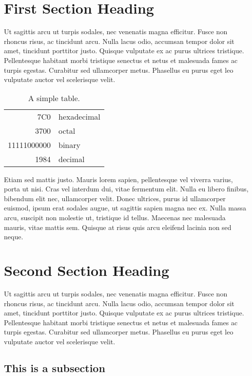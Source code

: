 \section{First Section Heading}

Ut sagittis arcu ut turpis sodales, nec venenatis magna efficitur. Fusce non rhoncus risus, ac tincidunt arcu. Nulla lacus odio, accumsan tempor dolor sit amet, tincidunt porttitor justo. Quisque vulputate ex ac purus ultrices tristique. Pellentesque habitant morbi tristique senectus et netus et malesuada fames ac turpis egestas. Curabitur sed ullamcorper metus. Phasellus eu purus eget leo vulputate auctor vel scelerisque velit.

\begin{table}[ht]
  \centering
  \caption{A simple table.}
  \begin{tabular}{|r|l|}
    \hline
    7C0 & hexadecimal \\
    3700 & octal \\ \cline{2-2}
    11111000000 & binary \\
    \hline \hline
    1984 & decimal \\
    \hline
  \end{tabular}
\end{table}
  
Etiam sed mattis justo. Mauris lorem sapien, pellentesque vel viverra varius, porta ut nisi. Cras vel interdum dui, vitae fermentum elit. Nulla eu libero finibus, bibendum elit nec, ullamcorper velit. Donec ultrices, purus id ullamcorper euismod, ipsum erat sodales augue, ut sagittis sapien magna nec ex. Nulla massa arcu, suscipit non molestie ut, tristique id tellus. Maecenas nec malesuada mauris, vitae mattis sem. Quisque at risus quis arcu eleifend lacinia non sed neque.

\section{Second Section Heading}

Ut sagittis arcu ut turpis sodales, nec venenatis magna efficitur. Fusce non rhoncus risus, ac tincidunt arcu. Nulla lacus odio, accumsan tempor dolor sit amet, tincidunt porttitor justo. Quisque vulputate ex ac purus ultrices tristique. Pellentesque habitant morbi tristique senectus et netus et malesuada fames ac turpis egestas. Curabitur sed ullamcorper metus. Phasellus eu purus eget leo vulputate auctor vel scelerisque velit.

\subsection{This is a subsection}

